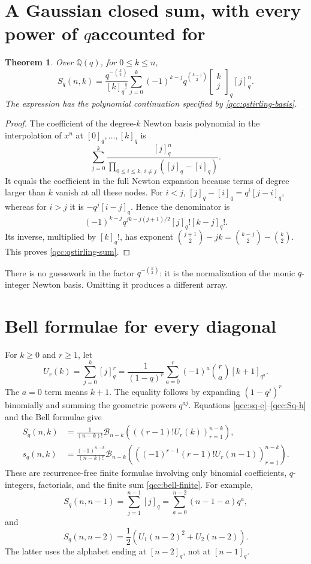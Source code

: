 \documentclass[11pt,a4paper,oneside,openany]{book}
\newtheorem{theorem}{Theorem}[chapter]
\theoremstyle{definition}
\theoremstyle{remark}
\newcommand{\Q}{\mathbb Q}
\newcommand{\GB}[3][q]{\begin{bmatrix}#2\\#3\end{bmatrix}_{#1}}
\newcommand{\Y}[1]{\mathcal B_{#1}}
\newcommand{\qbname}{\texorpdfstring{$q$}{q}}
\begin{document}
\section{A Gaussian closed sum, with every power of \qbname accounted for}
\begin{theorem}\label{qcc:qstirling-explicit}
Over \(\Q(q)\), for \(0\le k\le n\),
\begin{equation}\label{qcc:qstirling-sum}
 S_q(n,k)=\frac{q^{-\binom k2}}{[k]_q!}
 \sum_{j=0}^k(-1)^{k-j}q^{\binom{k-j}{2}}\GB kj[j]_q^n.
\end{equation}
The expression has the polynomial continuation specified by
\eqref{qcc:qstirling-basis}.
\end{theorem}
\begin{proof}
The coefficient of the degree-\(k\) Newton basis polynomial in the interpolation
of \(x^n\) at \([0]_q,\ldots,[k]_q\) is
\[
 \sum_{j=0}^k\frac{[j]_q^n}{\prod_{0\le i\le k,\ i\ne j}([j]_q-[i]_q)}.
\]
It equals the coefficient in the full Newton expansion because terms of degree
larger than \(k\) vanish at all these nodes. For \(i<j\),
\([j]_q-[i]_q=q^i[j-i]_q\), whereas for \(i>j\) it is
\(-q^j[i-j]_q\). Hence the denominator is
\[
 (-1)^{k-j}q^{jk-j(j+1)/2}[j]_q![k-j]_q!.
\]
Its inverse, multiplied by \([k]_q!\), has exponent
\(\binom{j+1}{2}-jk=\binom{k-j}{2}-\binom k2\).
This proves \eqref{qcc:qstirling-sum}.
\end{proof}
There is no guesswork in the factor \(q^{-\binom k2}\): it is the normalization
of the monic \(q\)-integer Newton basis. Omitting it produces a different array.

\section{Bell formulae for every diagonal}
For \(k\ge0\) and \(r\ge1\), let
\begin{equation}\label{qcc:qinteger-powersum}
 U_r(k)=\sum_{j=0}^k[j]_q^r
 =\frac1{(1-q)^r}\sum_{a=0}^r(-1)^a\binom ra[k+1]_{q^a}.
\end{equation}
The \(a=0\) term means \(k+1\). The equality follows by expanding
\((1-q^j)^r\) binomially and summing the geometric powers \(q^{aj}\).
Equations \eqref{qcc:sq-e}--\eqref{qcc:Sq-h} and the Bell formulae give
\begin{align}
 S_q(n,k)&=\frac1{(n-k)!}\Y{n-k}
   \left(\left((r-1)!U_r(k)\right)_{r=1}^{n-k}\right),\label{qcc:Sq-bell}\\
 s_q(n,k)&=\frac{(-1)^{n-k}}{(n-k)!}\Y{n-k}
   \left(\left((-1)^{r-1}(r-1)!U_r(n-1)\right)_{r=1}^{n-k}\right).
 \label{qcc:sq-bell}
\end{align}
These are recurrence-free finite formulae involving only binomial coefficients,
\(q\)-integers, factorials, and the finite sum \eqref{qcc:bell-finite}.
For example,
\[
 S_q(n,n-1)=\sum_{j=1}^{n-1}[j]_q
          =\sum_{a=0}^{n-2}(n-1-a)q^a,
\]
and
\[
 S_q(n,n-2)=\frac12\left(U_1(n-2)^2+U_2(n-2)\right).
\]
The latter uses the alphabet ending at \([n-2]_q\), not at \([n-1]_q\).
\end{document}
